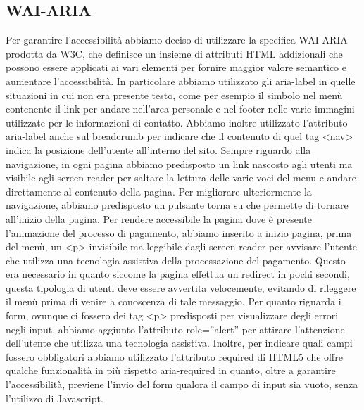 \documentclass[a4paper]{article}
\begin{document}
    \subsection{WAI-ARIA}
    Per garantire l’accessibilità abbiamo deciso di utilizzare la specifica WAI-ARIA prodotta da W3C, che definisce un insieme di attributi HTML addizionali che possono essere applicati ai vari elementi per fornire maggior valore semantico e aumentare l’accessibilità. In particolare abbiamo utilizzato gli aria-label in quelle situazioni in cui non era presente testo, come per esempio il simbolo nel menù contenente il link per andare nell’area personale e nel footer nelle varie immagini utilizzate per le informazioni di contatto. Abbiamo inoltre utilizzato l’attributo aria-label anche sul breadcrumb per indicare che il contenuto di quel tag <nav> indica la posizione dell’utente all’interno del sito. Sempre riguardo alla navigazione, in ogni pagina abbiamo predisposto un link nascosto agli utenti ma visibile agli screen reader per saltare la lettura delle varie voci del menu e andare direttamente al contenuto della pagina. Per migliorare ulteriormente la navigazione, abbiamo predisposto un pulsante torna su che permette di tornare all’inizio della pagina. Per rendere accessibile la pagina dove è presente l’animazione del processo di pagamento, abbiamo inserito a inizio pagina, prima del menù, un <p> invisibile ma leggibile dagli screen reader per avvisare l’utente che utilizza una tecnologia assistiva della processazione del pagamento. Questo era necessario in quanto siccome la pagina effettua un redirect in pochi secondi, questa tipologia di utenti deve essere avvertita velocemente, evitando di rileggere il menù prima di venire a conoscenza di tale messaggio. Per quanto riguarda i form, ovunque ci fossero dei tag <p> predisposti per visualizzare degli errori negli input, abbiamo aggiunto l’attributo role=”alert” per attirare l’attenzione dell’utente che utilizza una tecnologia assistiva. Inoltre, per indicare quali campi fossero obbligatori abbiamo utilizzato l’attributo required di HTML5 che offre qualche funzionalità in più rispetto aria-required in quanto, oltre a garantire l'accessibilità, previene l’invio del form qualora il campo di input sia vuoto, senza l’utilizzo di Javascript.
\end{document}
